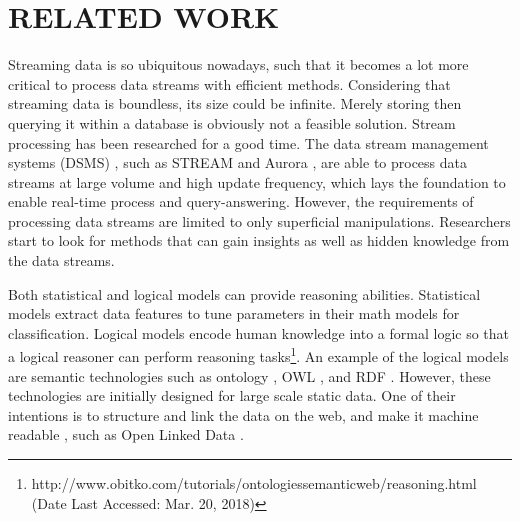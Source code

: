 
\chapter{RELATED WORK}
Streaming data is so ubiquitous nowadays, such that it becomes a lot more critical to process data streams with efficient methods.
Considering that streaming data is boundless, its size could be infinite. 
Merely storing then querying it within a database is obviously not a feasible solution.
Stream processing \cite{stephens1997survey} has been researched for a good time.
The data stream management systems (DSMS) \cite{cugola2012processing}, such as STREAM \cite{arasu2003stream} and Aurora \cite{abadi2003aurora}, are able to process data streams at large volume and high update frequency, which lays the foundation to enable real-time process and query-answering. 
However, the requirements of processing data streams are limited to only superficial manipulations.
Researchers start to look for methods that can gain insights as well as hidden knowledge from the data streams.

Both statistical and logical models can provide reasoning abilities. 
Statistical models extract data features to tune parameters in their math models for classification. 
Logical models encode human knowledge into a formal logic so that a logical reasoner can perform reasoning tasks\footnote{http://www.obitko.com/tutorials/ontologies\-semantic\-web/reasoning.html (Date Last Accessed: Mar. 20, 2018)}.
An example of the logical models are semantic technologies such as ontology \cite{noy2001ontology}, OWL \cite{bechhofer2009owl}, and RDF \cite{lassila1999resource}.
However, these technologies are initially designed for large scale static data.
One of their intentions is to structure and link the data on the web, and make it machine readable \cite{berners2001semantic}, such as Open Linked Data \cite{bizer2009linked}.

